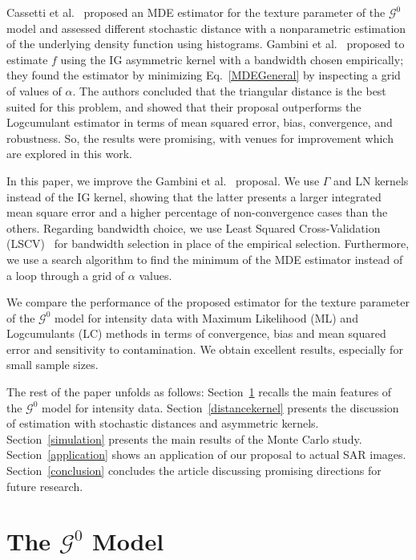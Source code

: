 \documentclass[twocolumn]{svjour3}
\begin{document}
	Cassetti et al.~\cite{APSAR2013ParameterEstimationStochasticDistances} proposed an MDE estimator for the texture parameter of the $\mathcal{G}^0$ model and assessed different stochastic distance with a nonparametric estimation of the underlying density function using histograms. 
	Gambini et al.~\cite{gambini2015} proposed to estimate $f$ using the IG asymmetric kernel with a bandwidth chosen empirically; 
	they found the estimator by minimizing Eq.~\eqref{MDEGeneral} by inspecting a grid of values of $\alpha$. 
	The authors concluded that the triangular distance is the best suited for this problem, and showed that their proposal outperforms the Logcumulant estimator in terms of mean squared error, bias, convergence, and robustness. 
	So, the results were promising, with venues for improvement which are explored in this work.
	
	In this paper, we improve the Gambini et al.~\cite{gambini2015} proposal. 
	We use $\Gamma$ and LN kernels instead of the IG kernel, showing that the latter presents a larger integrated mean square error and a higher percentage of non-convergence cases than the others.
	Regarding bandwidth choice, we use Least Squared Cross-Validation (LSCV)~\cite{Rudemo1982} for bandwidth selection in place of the empirical selection. 
	Furthermore, we use a search algorithm to find the minimum of the MDE estimator instead of a loop through a grid of $\alpha$ values. 
	
	We compare the performance of the proposed estimator for the texture parameter of the $\mathcal{G}^0$ model for intensity data with Maximum Likelihood (ML) and Logcumulants (LC) methods in terms of convergence, bias and mean squared error and sensitivity to contamination. 
	We obtain excellent results, especially for small sample sizes.
	
	The rest of the paper unfolds as follows: 
	Section~\ref{sec_SAR} recalls the main features of the $\mathcal{G}^0$ model for intensity data.
	Section~\ref{distancekernel} presents the discussion of estimation with stochastic distances and asymmetric kernels. 
	Section~\ref{simulation} presents the main results of the Monte Carlo study. Section~\ref{application} shows an application of our proposal to actual SAR images.
	Section~\ref{conclusion} concludes the article discussing promising directions for future research.
	
	\section{The $\mathcal{G}^0$ Model}
	\label{sec_SAR}
	
\end{document}
